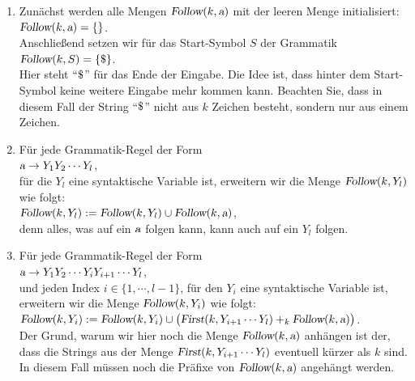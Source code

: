 \begin{enumerate}
\item Zunächst werden alle Mengen $\textsl{Follow}(k, \textsl{a})$ mit der leeren Menge initialisiert:
      \\[0.2cm]
      \hspace*{1.3cm}
      $\textsl{Follow}(k, \textsl{a}) = \{\}$.
      \\[0.2cm]
      Anschließend setzen wir für das Start-Symbol $S$ der Grammatik
      \\[0.2cm]
      \hspace*{1.3cm}
      $\textsl{Follow}(k, S) = \{ \symbol{36} \}$.
      \\[0.2cm]
      Hier steht ``$\symbol{36}$'' für das Ende der Eingabe.  Die Idee ist, dass hinter dem
      Start-Symbol keine weitere Eingabe mehr kommen kann.  Beachten Sie, dass in diesem
      Fall der String ``$\symbol{36}$'' nicht aus $k$ Zeichen besteht, sondern nur aus
      einem Zeichen.
\item Für jede Grammatik-Regel der Form
      \\[0.2cm]
      \hspace*{1.3cm}
      $\textsl{a} \rightarrow Y_1 Y_2 \cdots Y_l$,
      \\[0.2cm]
      für die $Y_l$ eine syntaktische Variable ist, erweitern wir die Menge
      $\textsl{Follow}(k, Y_l)$ wie folgt:
      \\[0.2cm]
      \hspace*{1.3cm}
      $\textsl{Follow}(k, Y_l) := \textsl{Follow}(k, Y_l) \cup \textsl{Follow}(k, \textsl{a})$,
      \\[0.2cm]
      denn alles, was auf ein $\textsl{a}$ folgen kann, kann auch auf ein $Y_l$ folgen.
\item Für jede Grammatik-Regel der Form
      \\[0.2cm]
      \hspace*{1.3cm}
      $\textsl{a} \rightarrow Y_1 Y_2 \cdots Y_i Y_{i+1} \cdots Y_l$,
      \\[0.2cm]
      und jeden Index $i \in \{1, \cdots, l-1\}$, für den $Y_i$ eine syntaktische Variable
      ist, erweitern wir die Menge $\textsl{Follow}(k, Y_i)$ wie folgt:
      \\[0.2cm]
      \hspace*{1.3cm}
      $\textsl{Follow}(k, Y_i) := \textsl{Follow}(k, Y_i) \cup
       \bigl(\textsl{First}(k, Y_{i+1} \cdots Y_l) +_k \textsl{Follow}(k,\textsl{a})\bigr) 
      $.
      \\[0.2cm]
      Der Grund, warum wir hier noch die Menge $\textsl{Follow}(k,\textsl{a})$ anhängen ist der,
      dass die Strings aus  der Menge $\textsl{First}(k, Y_{i+1} \cdots Y_l)$ eventuell
      kürzer als $k$ sind.  In diesem Fall müssen noch die Präfixe von
      $\textsl{Follow}(k, \textsl{a})$ angehängt werden.


\end{enumerate}
